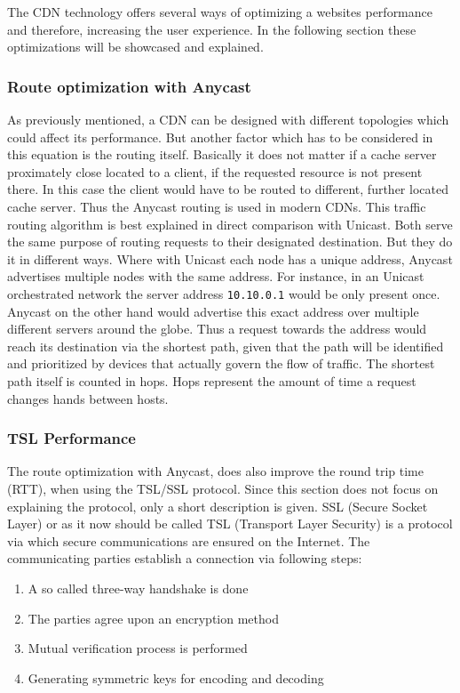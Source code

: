 The CDN technology offers several ways of optimizing a websites performance and therefore, increasing the user experience. In the following section these optimizations will be showcased and explained.

\subsubsection{Route optimization with Anycast}

As previously mentioned, a CDN can be designed with different topologies which could affect its performance. But another factor which has to be considered in this equation is the routing itself. Basically it does not matter if a cache server proximately close located to a client, if the requested resource is not present there. In this case the client would have to be routed to different, further located cache server. 
Thus the Anycast routing is used in modern CDNs. This traffic routing algorithm is best explained in direct comparison with Unicast. Both serve the same purpose of routing requests to their designated destination. But they do it in different ways. Where with Unicast each node has a unique address, Anycast advertises multiple nodes with the same address.
For instance, in an Unicast orchestrated network the server address \texttt{10.10.0.1} would be only present once. Anycast on the other hand would advertise this exact address over multiple different servers around the globe. Thus a request towards the address would reach its destination via the shortest path, given that the path will be identified and prioritized by devices that actually govern the flow of traffic.
The shortest path itself is counted in hops. Hops represent the amount of time a request changes hands between hosts.\cite{cdn_route_opt}

\subsubsection{TSL Performance}

The route optimization with Anycast, does also improve the round trip time (RTT), when using the TSL/SSL protocol. Since this section does not focus on explaining the protocol, only a short description is given.
SSL (Secure Socket Layer) or as it now should be called TSL (Transport Layer Security) is a protocol via which secure communications are ensured on the Internet. The communicating parties establish a connection via following steps:

\begin{enumerate}[noitemsep]
	\item A so called three-way handshake is done
	\item The parties agree upon an encryption method
	\item Mutual verification process is performed
	\item Generating symmetric keys for encoding and decoding	
\end{enumerate}

